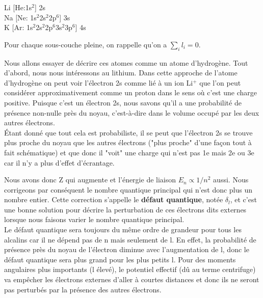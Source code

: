 \vspace{0.2cm}

\begin{center}

Li [He:1s$^{2}$] 2s \\
Na [Ne: 1s$^{2}$2s$^{2}$2p$^{6}$] 3s \\
K [Ar: 1s$^{2}$2s$^{2}$2p$^{6}$3s$^{2}$3p$^{6}$] 4s 

\end{center}

\vspace{0.2cm}

Pour chaque sous-couche pleine, on rappelle qu'on a $\sum_i l_i = 0$.

Nous allons essayer de décrire ces atomes comme un atome d'hydrogène. Tout d'abord, nous nous intéressons au lithium. Dans cette approche de l'atome d'hydrogène on peut voir l'électron 2s comme lié à un ion Li$^{+}$ que l'on peut considérer approximativement comme un proton dans le sens où c'est une charge positive. Puisque c'est un électron 2s, nous savons qu'il a une probabilité de présence non-nulle près du noyau, c'est-à-dire dans le volume occupé par les deux autres électrons.\\  


Étant donné que tout cela est probabiliste, il se peut que l'électron 2s se trouve plus proche du noyau que les autres électrons ("plus proche" d'une façon tout à fait schématique) et que donc il "voit" une charge qui n'est pas 1e mais 2e ou 3e car il n'y a plus d'effet d'écrantage.

Nous avons donc Z qui augmente et l'énergie de liaison $E_n \propto 1/n^2$ aussi. Nous corrigeons par conséquent le nombre quantique principal qui n'est donc plus un nombre entier. Cette correction s’appelle le \textbf{défaut quantique}, notée $\delta_l$, et c’est une bonne solution pour décrire la perturbation de ces électrons dits externes lorsque nous faisons varier le nombre quantique principal.\\
Le défaut quantique sera toujours du même ordre de grandeur pour tous les alcalins car il ne dépend pas de n mais seulement de l. En effet, la probabilité de présence près du noyau de l'électron diminue avec l'augmentation de l, donc le défaut quantique sera plus grand pour les plus petits l. Pour des moments angulaires plus importants (l élevé), le potentiel effectif (dû au terme centrifuge) va empêcher les électrons externes d’aller à courtes distances et donc ils ne seront pas perturbés par la présence des autres électrons.
 
